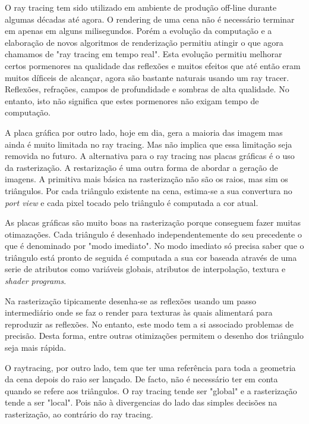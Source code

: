 \documentclass[12pt]{article}
\begin{document}
O ray tracing tem sido utilizado em ambiente de produção off-line durante algumas décadas até agora. O rendering de uma cena não é necessário terminar em apenas em alguns milisegundos. Porém a evolução da computação e a elaboração de novos algoritmos de renderização permitiu atingir o que agora chamamos de "ray tracing em tempo real". Esta evolução permitiu melhorar certos pormenores na qualidade das reflexões e muitos efeitos que até então eram muitos díficeis de alcançar, agora são bastante naturais usando um ray tracer. Reflexões, refrações, campos de profundidade e sombras de alta qualidade. No entanto, isto não significa que estes pormenores não exigam tempo de computação.\newline

A placa gráfica por outro lado, hoje em dia, gera a maioria das imagem mas ainda é muito limitada no ray tracing. Mas não implica que essa limitação seja removida no futuro. A alternativa para o ray tracing nas placas gráficas é o uso da rasterização. A restarização é uma outra forma de abordar a geração de imagens.
A primitiva mais básica na rasterização não são os raios, mas sim os triângulos. Por cada triângulo existente na cena, estima-se a sua convertura no {\it port view} e cada pixel tocado pelo triângulo é computada a cor atual.\newline

As placas gráficas são muito boas na rasterização porque conseguem fazer muitas otimazações. Cada triângulo é desenhado independentemente do seu precedente o que é denominado por "modo imediato". No modo imediato só precisa saber que o triângulo está pronto de seguida é computada a sua cor baseada através de uma serie de atributos como variáveis globais, atributos de interpolação, textura e {\it shader programs}.\newline

Na rasterização tipicamente desenha-se as reflexões usando um passo intermediário onde se faz o render para texturas às quais alimentará para reproduzir as reflexões. No entanto, este modo tem a si associado problemas de precisão. Desta forma, entre outras otimizações permitem o desenho dos triângulo seja mais rápida.\newline

O raytracing, por outro lado, tem que ter uma referência para toda a geometria da cena depois do raio ser lançado. De facto, não é necessário ter em conta quando se refere aos triângulos. O ray tracing tende ser "global" e a rasterização tende a ser "local". Pois não à divergencias do lado das simples decisões na rasterização, ao contrário do ray tracing.\newline
\end{document}
